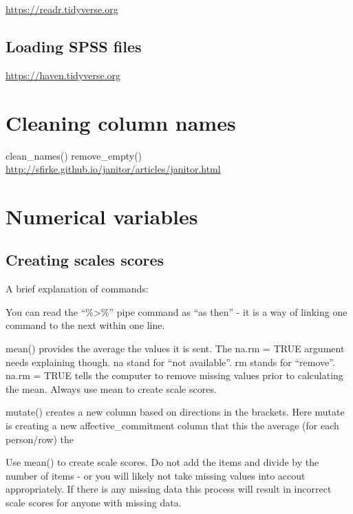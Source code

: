 \documentclass[
]{krantz}
\makeatletter
\newenvironment{kframe}{%
\medskip{}
\setlength{\fboxsep}{.8em}
 \def\at@end@of@kframe{}%
 \ifinner\ifhmode%
  \def\at@end@of@kframe{\end{minipage}}%
  \begin{minipage}{\columnwidth}%
 \fi\fi%
 \def\FrameCommand##1{\hskip\@totalleftmargin \hskip-\fboxsep
 \colorbox{shadecolor}{##1}\hskip-\fboxsep
     \hskip-\linewidth \hskip-\@totalleftmargin \hskip\columnwidth}%
 \MakeFramed {\advance\hsize-\width
   \@totalleftmargin\z@ \linewidth\hsize
   \@setminipage}}%
 {\par\unskip\endMakeFramed%
 \at@end@of@kframe}
\newenvironment{rmdblock}[1]
  {
  \begin{itemize}
  \renewcommand{\labelitemi}{
    \raisebox{-.7\height}[0pt][0pt]{
      {\setkeys{Gin}{width=3em,keepaspectratio}\texttt{[image: images/\#1]}}
    }
  }
  \setlength{\fboxsep}{1em}
  \begin{kframe}
  \item
  }
  {
  \end{kframe}
  \end{itemize}
  }
\newenvironment{rmdcaution}
  {\begin{rmdblock}{caution}}
  {\end{rmdblock}}
\makeatother
\begin{document}
\url{https://readr.tidyverse.org}

\hypertarget{loading-spss-files}{%
\subsection{Loading SPSS files}\label{loading-spss-files}}

\url{https://haven.tidyverse.org}

\hypertarget{cleaning-column-names}{%
\section{Cleaning column names}\label{cleaning-column-names}}

clean\_names()
remove\_empty()
\url{http://sfirke.github.io/janitor/articles/janitor.html}

\hypertarget{numerical-variables}{%
\section{Numerical variables}\label{numerical-variables}}

\hypertarget{creating-scales-scores}{%
\subsection{Creating scales scores}\label{creating-scales-scores}}

A brief explanation of commands:

You can read the ``\%\textgreater\%'' pipe command as ``as then'' - it is a way of linking one command to the next within one line.

mean() provides the average the values it is sent. The na.rm = TRUE argument needs explaining though. na stand for ``not available''. rm stands for ``remove''. na.rm = TRUE tells the computer to remove missing values prior to calculating the mean.
Always use mean to create scale scores.

mutate() creates a new column based on directions in the brackets. Here mutate is creating a new affective\_commitment column that this the average (for each person/row) the

\begin{rmdcaution}
\begin{rmdcaution}

Use mean() to create scale scores. Do not add the items and divide by the number of items - or you will likely not take missing values into accout appropriately. If there is any missing data this process will result in incorrect scale scores for anyone with missing data.

\end{rmdcaution}
\end{rmdcaution}
\end{document}
